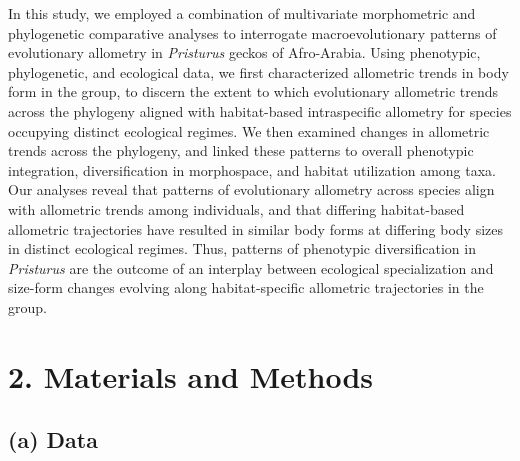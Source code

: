 \documentclass[
  11pt,
]{article}
\begin{document}
In this study, we employed a combination of multivariate morphometric
and phylogenetic comparative analyses to interrogate macroevolutionary
patterns of evolutionary allometry in \emph{Pristurus} geckos of
Afro-Arabia. Using phenotypic, phylogenetic, and ecological data, we
first characterized allometric trends in body form in the group, to
discern the extent to which evolutionary allometric trends across the
phylogeny aligned with habitat-based intraspecific allometry for species
occupying distinct ecological regimes. We then examined changes in
allometric trends across the phylogeny, and linked these patterns to
overall phenotypic integration, diversification in morphospace, and
habitat utilization among taxa. Our analyses reveal that patterns of
evolutionary allometry across species align with allometric trends among
individuals, and that differing habitat-based allometric trajectories
have resulted in similar body forms at differing body sizes in distinct
ecological regimes. Thus, patterns of phenotypic diversification in
\emph{Pristurus} are the outcome of an interplay between ecological
specialization and size-form changes evolving along habitat-specific
allometric trajectories in the group.

\hypertarget{materials-and-methods}{%
\section{2. Materials and Methods}\label{materials-and-methods}}

\hypertarget{a-data}{%
\subsection{(a) Data}\label{a-data}}
\end{document}
